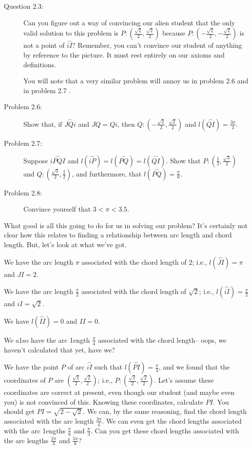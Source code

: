 \documentclass[english]{book}
\newcommand{\arc}[1]{\overset{\frown}{#1} }
\begin{document}
\begin{description}

\item[Question 2.3:] Can you figure out a way of convincing our alien student that the only valid solution to this problem is $P:(\frac{\sqrt{2}}{2}, \frac{\sqrt{2}}{2})$ because $P:(-\frac{\sqrt{2}}{2}, -\frac{\sqrt{2}}{2})$ is not a point of $\arc{iI}$? Remember, you can't convince our student of anything by reference to the picture. It must rest entirely on our axioms and definitions.

  You will note that a very similar problem will annoy us in problem 2.6 and in problem 2.7 .

\item[Problem 2.6:] Show that, if $\arc{JQi}$ and $JQ = Qi$, then $Q:(-\frac{\sqrt{2}}{2}, \frac{\sqrt{2}}{2})$ and $l(\arc{QI}) = \frac{3\pi}{4}$.

\item[Problem 2.7:] Suppose $\arc{iPQI}$ and $l(\arc{iP}) = l(\arc{PQ}) = l(\arc{QI})$. Show that $P:(\frac{1}{2}, \frac{\sqrt{3}}{2})$ and $Q:(\frac{\sqrt{3}}{2},\frac{1}{2})$, and furthermore, that $l(\arc{PQ}) = \frac{\pi}{6}$.

\item[Problem 2.8:] Convince yourself that $3 < \pi < 3.5$.

\end{description}

What good is all this going to do for us in solving our problem? It's certainly not clear how this relates to finding a relationship between arc length and chord length. But, let's look at what we've got.

We have the arc length $\pi$ associated with the chord length of $2$; i.e., $l(\arc{JI}) = \pi$ and $JI=2$.

We have the arc length $\frac{\pi}{2}$ associated with the chord length of $\sqrt{2}$; i.e., $l(\arc{iI}) = \frac{\pi}{2}$ and $iI=\sqrt{2}$. 

We have $l(\arc{II}) = 0$ and $II = 0$.

We a1so have the arc 1ength $\frac{\pi}{4}$ associated with the chord length-- oops, we haven't calculated that yet, have we? 

We have the point $P$ of arc $\arc{iI}$ such that $l(\arc{PI}) = \frac{\pi}{4}$, and we found that the coordinates of $P$ are $(\frac{\sqrt{2}}{2}, \frac{\sqrt{2}}{2})$; i.e., $P: (\frac{\sqrt{2}}{2}, \frac{\sqrt{2}}{2})$. Let's assume these coordinates are correct at present, even though our student (and maybe even you) is not convinced of this. Knowing these coordinates, calculate $PI$. You should get $PI = \sqrt{2 - \sqrt{2}}$. We can, by the same reasoning, find the chord length associated with the arc length $\frac{3\pi}{4}$. We can even get the chord lengths associated with the arc 1engths $\frac{\pi}{6}$ and $\frac{\pi}{3}$. Can you get these chord lengths associated with the arc lengths $\frac{2\pi}{3}$ and $\frac{5\pi}{6}$?
\end{document}
